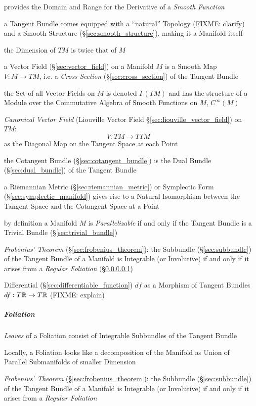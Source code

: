 provides the Domain and Range for the Derivative of a \emph{Smooth Function}

a Tangent Bundle comes equipped with a ``natural'' Topology (FIXME: clarify)
and a Smooth Structure (\S\ref{sec:smooth_structure}), making it a Manifold
itself

the Dimension of $T M$ is twice that of $M$

a Vector Field (\S\ref{sec:vector_field}) on a Manifold $M$ is a Smooth Map $V
: M \rightarrow T M$, i.e. a \emph{Cross Section} (\S\ref{sec:cross_section})
of the Tangent Bundle

the Set of all Vector Fields on $M$ is denoted $\Gamma(TM)$ and has the
structure of a Module over the Commutative Algebra of Smooth Functions on $M$,
$C^\infty(M)$

\emph{Canonical Vector Field} (Liouville Vector Field
\S\ref{sec:liouville_vector_field}) on $TM$:
\[
  V : TM \rightarrow TTM
\]
as the Diagonal Map on the Tangent Space at each Point

the Cotangent Bundle (\S\ref{sec:cotangent_bundle}) is the Dual Bundle
(\S\ref{sec:dual_bundle}) of the Tangent Bundle

a Riemannian Metric (\S\ref{sec:riemannian_metric}) or Symplectic Form
(\S\ref{sec:symplectic_manifold}) gives rise to a Natural Isomorphism between
the Tangent Space and the Cotangent Space at a Point

by definition a Manifold $M$ is \emph{Parallelizable} if and only if the
Tangent Bundle is a Trivial Bundle (\S\ref{sec:trivial_bundle})

\emph{Frobenius' Theorem} (\S\ref{sec:frobenius_theorem}): the Subbundle
(\S\ref{sec:subbundle}) of the Tangent Bundle of a Manifold is Integrable (or
Involutive) if and only if it arises from a \emph{Regular Foliation}
(\S\ref{sec:foliation})

Differential (\S\ref{sec:differentiable_function}) $df$ as a Morphism of
Tangent Bundles $df : T\mathbb{R} \rightarrow T\mathbb{R}$ (FIXME: explain)



\subparagraph{Foliation}\label{sec:foliation}\hfill

\emph{Leaves} of a Foliation consist of Integrable Subbundles of the Tangent
Bundle

Locally, a Foliation looks like a decomposition of the Manifold as Union of
Parallel Submanifolds of smaller Dimension

\emph{Frobenius' Theorem} (\S\ref{sec:frobenius_theorem}): the Subbundle
(\S\ref{sec:subbundle}) of the Tangent Bundle of a Manifold is Integrable (or
Involutive) if and only if it arises from a \emph{Regular Foliation}

